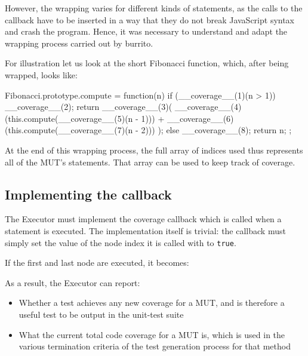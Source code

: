However, the wrapping varies for different kinds of statements, as the calls to the callback have to be inserted in a way that they do not break JavaScript syntax and crash the program. Hence, it was necessary to understand and adapt the wrapping process carried out by \textsf{burrito}.

For illustration let us look at the short Fibonacci function, which, after being wrapped, looks like:

\begin{code}[caption=Wrapped Fibonacci,label=wrappedfib]
Fibonacci.prototype.compute = function(n) {
  if (__coverage__(1)(n > 1)) {
    __coverage__(2);
    return __coverage__(3)(
               __coverage__(4)(this.compute(__coverage__(5)(n - 1))) +
               __coverage__(6)(this.compute(__coverage__(7)(n - 2)))
           );
  } else {
    __coverage__(8);
    return n;
  }
};
\end{code}

At the end of this wrapping process, the full array of indices used thus represents all of the MUT's statements. That array can be used to keep track of coverage.

\subsection{Implementing the callback}
The \textsf{Executor} must implement the coverage callback which is called when a statement is executed. The implementation itself is trivial: the callback must simply set the value of the node index it is called with to \texttt{true}.


\begin{code}
\end{code}

\noindent If the first and last node are executed, it becomes:

\begin{code}
\end{code}

As a result, the \textsf{Executor} can report:

\begin{itemize}
   \item Whether a test achieves any new coverage for a MUT, and is therefore a useful test to be output in the unit-test suite
   \item What the current total code coverage for a MUT is, which is used in the various termination criteria of the test generation process for that method
\end{itemize}



